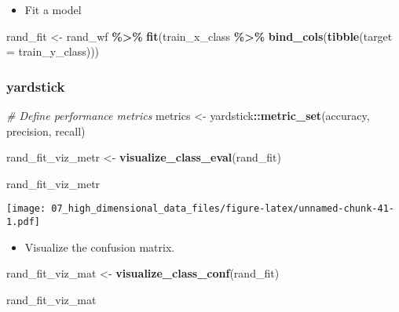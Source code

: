 \documentclass[
]{book}
\newenvironment{Shaded}{\begin{snugshade}}{\end{snugshade}}
\newcommand{\CommentTok}[1]{\textcolor[rgb]{0.56,0.35,0.01}{\textit{#1}}}
\newcommand{\DataTypeTok}[1]{\textcolor[rgb]{0.13,0.29,0.53}{#1}}
\newcommand{\KeywordTok}[1]{\textcolor[rgb]{0.13,0.29,0.53}{\textbf{#1}}}
\newcommand{\NormalTok}[1]{#1}
\newcommand{\OperatorTok}[1]{\textcolor[rgb]{0.81,0.36,0.00}{\textbf{#1}}}
\newcommand{\StringTok}[1]{\textcolor[rgb]{0.31,0.60,0.02}{#1}}
\providecommand{\tightlist}{%
  \setlength{\itemsep}{0pt}\setlength{\parskip}{0pt}}
\begin{document}
\begin{itemize}
\tightlist
\item
  Fit a model
\end{itemize}

\begin{Shaded}
\begin{Highlighting}[]
\NormalTok{rand\_fit \textless{}{-}}\StringTok{ }\NormalTok{rand\_wf }\OperatorTok{\%\textgreater{}\%}\StringTok{ }\KeywordTok{fit}\NormalTok{(train\_x\_class }\OperatorTok{\%\textgreater{}\%}\StringTok{ }\KeywordTok{bind\_cols}\NormalTok{(}\KeywordTok{tibble}\NormalTok{(}\DataTypeTok{target =}\NormalTok{ train\_y\_class)))}
\end{Highlighting}
\end{Shaded}

\hypertarget{yardstick-2}{%
\subsubsection{yardstick}\label{yardstick-2}}

\begin{Shaded}
\begin{Highlighting}[]
\CommentTok{\# Define performance metrics}
\NormalTok{metrics \textless{}{-}}\StringTok{ }\NormalTok{yardstick}\OperatorTok{::}\KeywordTok{metric\_set}\NormalTok{(accuracy, precision, recall)}

\NormalTok{rand\_fit\_viz\_metr \textless{}{-}}\StringTok{ }\KeywordTok{visualize\_class\_eval}\NormalTok{(rand\_fit)}

\NormalTok{rand\_fit\_viz\_metr}
\end{Highlighting}
\end{Shaded}

\texttt{[image: 07\_high\_dimensional\_data\_files/figure-latex/unnamed-chunk-41-1.pdf]}

\begin{itemize}
\tightlist
\item
  Visualize the confusion matrix.
\end{itemize}

\begin{Shaded}
\begin{Highlighting}[]
\NormalTok{rand\_fit\_viz\_mat \textless{}{-}}\StringTok{ }\KeywordTok{visualize\_class\_conf}\NormalTok{(rand\_fit)}

\NormalTok{rand\_fit\_viz\_mat}
\end{Highlighting}
\end{Shaded}
\end{document}
